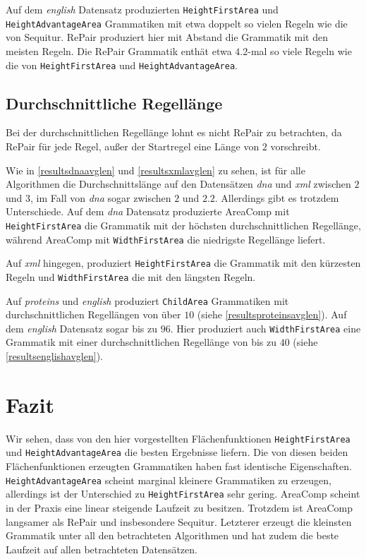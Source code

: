 Auf dem \emph{english} Datensatz produzierten \texttt{HeightFirstArea} und \texttt{HeightAdvantageArea} Grammatiken mit etwa doppelt so vielen Regeln wie die von Sequitur.
RePair produziert hier mit Abstand die Grammatik mit den meisten Regeln. Die RePair Grammatik enthät etwa $4.2$-mal so viele Regeln wie die von \texttt{HeightFirstArea} und \texttt{HeightAdvantageArea}.

\subsection{Durchschnittliche Regellänge}

Bei der durchschnittlichen Regellänge lohnt es nicht RePair zu betrachten, da RePair für jede Regel, außer der Startregel eine Länge von $2$ vorschreibt.

Wie in \autoref{resultsdnaavglen} und \autoref{resultsxmlavglen} zu sehen, ist für alle Algorithmen die Durchschnittslänge auf den Datensätzen \emph{dna} und \emph{xml} zwischen $2$ und $3$, im Fall von \emph{dna} sogar zwischen $2$ und $2.2$. Allerdings gibt es trotzdem Unterschiede. Auf dem \emph{dna} Datensatz produzierte AreaComp mit \texttt{HeightFirstArea} die Grammatik mit der höchsten durchschnittlichen Regellänge, während AreaComp mit \texttt{WidthFirstArea} die niedrigste Regellänge liefert.

Auf \emph{xml} hingegen, produziert \texttt{HeightFirstArea} die Grammatik mit den kürzesten Regeln und \texttt{WidthFirstArea} die mit den längsten Regeln.

Auf \emph{proteins} und \emph{english} produziert \texttt{ChildArea} Grammatiken mit durchschnittlichen Regellängen von über $10$ (siehe \autoref{resultsproteinsavglen}). Auf dem \emph{english} Datensatz sogar bis zu $96$.
Hier produziert auch \texttt{WidthFirstArea} eine Grammatik mit einer durchschnittlichen Regellänge von bis zu $40$ (siehe \autoref{resultsenglishavglen}).


\section{Fazit}

Wir sehen, dass von den hier vorgestellten Flächenfunktionen \texttt{HeightFirstArea} und \texttt{HeightAdvantageArea} die besten Ergebnisse liefern. Die von diesen beiden Flächenfunktionen erzeugten Grammatiken haben fast identische Eigenschaften. \texttt{HeightAdvantageArea} scheint marginal kleinere Grammatiken zu erzeugen, allerdings ist der Unterschied zu \texttt{HeightFirstArea} sehr gering. AreaComp scheint in der Praxis eine linear steigende Laufzeit zu besitzen. Trotzdem ist AreaComp langsamer als RePair und insbesondere Sequitur. Letzterer erzeugt die kleinsten Grammatik unter all den betrachteten Algorithmen und hat zudem die beste Laufzeit auf allen betrachteten Datensätzen.

